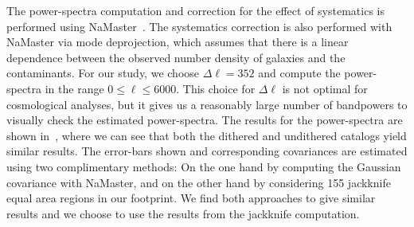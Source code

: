 \documentclass[\docopts]{\docclass}
\begin{document}
The power-spectra computation and correction for the effect of systematics is performed using NaMaster~\citep{2019MNRAS.484.4127A}. The systematics correction is also performed with NaMaster via mode deprojection, which assumes that there is a linear dependence between the observed number density of galaxies and the contaminants. For our study, we choose $\Delta \ell = 352$ and compute the power-spectra in the range $0 \leq \ell \leq 6000$. This choice for $\Delta\ell$ is not optimal for cosmological analyses, but it gives us a reasonably large number of bandpowers to visually check the estimated power-spectra. The results for the power-spectra are shown in~, where we can see that both the dithered and undithered catalogs yield similar results. The error-bars shown and corresponding covariances are estimated using two complimentary methods: On the one hand by computing the Gaussian covariance with NaMaster, and on the other hand by considering 155 jackknife equal area regions in our footprint. We find both approaches to give similar results and we choose to use the results from the jackknife computation.
\end{document}
